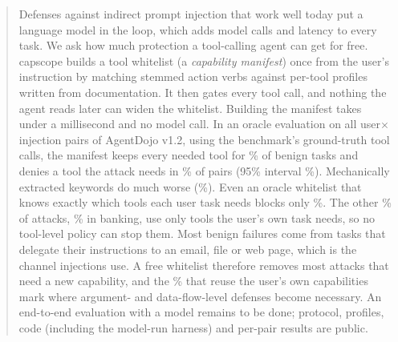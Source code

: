 \begin{abstract}
Defenses against indirect prompt injection that work well today put a language model in the loop, which adds model
calls and latency to every task. We ask how much protection a tool-calling agent can get for free. capscope builds a
tool whitelist (a \emph{capability manifest}) once from the user's instruction by matching stemmed action verbs against
per-tool profiles written from documentation. It then gates every tool call, and nothing the agent reads later can widen
the whitelist. Building the manifest takes under a millisecond and no model call. In an oracle evaluation on all
 user$\times$injection pairs of AgentDojo v1.2, using the benchmark's ground-truth tool calls, the manifest keeps
every needed tool for \% of benign tasks and denies a tool the attack needs in \% of pairs
(95\% interval \%). Mechanically extracted keywords do much worse (\%). Even an oracle whitelist
that knows exactly which tools each user task needs blocks only \%. The other \% of attacks,
\% in banking, use only tools the user's own task needs, so no tool-level policy can stop them.
Most benign failures come from tasks that delegate their instructions to an email, file or web page, which is the
channel injections use. A free whitelist therefore removes most attacks that need a new capability, and the
\% that reuse the user's own capabilities mark where argument- and data-flow-level defenses become
necessary. An end-to-end evaluation with a model remains to be done; protocol, profiles, code (including the
model-run harness) and per-pair results are public.
\end{abstract}
